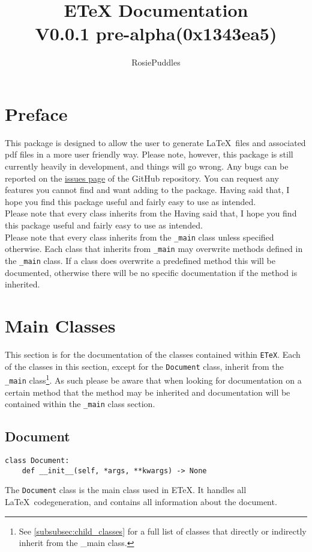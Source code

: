 \documentclass{article}
\title{ETeX Documentation\\\large V0.0.1 pre-alpha(0x1343ea5)}
\date{}
\author{RosiePuddles}
\begin{document}
\maketitle
\tableofcontents
\newpage

\section{Preface}\label{sec:preface}
This package is designed to allow the user to generate \LaTeX\ files and associated pdf files in a more user friendly way. Please note, however, this package is still currently heavily in development, and things will go wrong. Any bugs can be reported on the \href{https://github.com/RosiePuddles/ETeX\_from\_python/issues}{issues page} of the GitHub repository. You can request any features you cannot find and want adding to the package. Having said that, I hope you find this package useful and fairly easy to use as intended.\\
Please note that every class inherits from the  Having said that, I hope you find this package useful and fairly easy to use as intended.\\
Please note that every class inherits from the \verb|_main| class unless specified otherwise. Each class that inherits from \verb|_main| may overwrite methods defined in the \verb|_main| class. If a class does overwrite a predefined method this will be documented, otherwise there will be no specific documentation if the method is inherited.
\section{Main Classes}\label{sec:main_classes}
This section is for the documentation of the classes contained within \verb|ETeX|. Each of the classes in this section, except for the \verb|Document| class, inherit from the \verb|_main| class\footnote{See \autoref{subsubsec:child_classes} for a full list of classes that directly or indirectly inherit from the \_main class.}. As such please be aware that when looking for documentation on a certain method that the method may be inherited and documentation will be contained within the \verb|_main| class section.
\subsection{Document}\label{subsec:document}
\begin{verbatim}
class Document:
	def __init__(self, *args, **kwargs) -> None
\end{verbatim}
The \verb|Document| class is the main class used in ETeX. It handles all \LaTeX\ codegeneration, and contains all information about the document.
\end{document}
